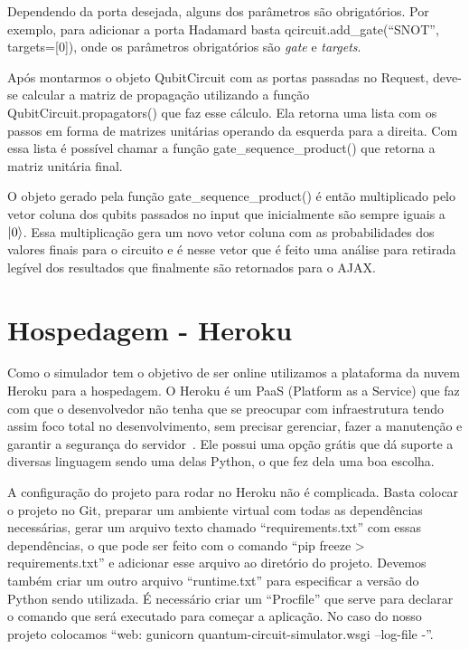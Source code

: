 \documentclass[a4paper, 12pt, oneside]{book}
\begin{document}
Dependendo da porta desejada, alguns dos parâmetros são obrigatórios. Por exemplo, para adicionar a porta Hadamard basta qcircuit.add\_gate(``SNOT'', targets=[0]), onde os parâmetros obrigatórios são \textit{gate} e \textit{targets}.

Após montarmos o objeto QubitCircuit com as portas passadas no Request, deve-se calcular a matriz de propagação utilizando a função QubitCircuit.propagators() que faz esse cálculo. Ela retorna uma lista com os passos em forma de matrizes unitárias operando da esquerda para a direita. Com essa lista é possível chamar a função gate\_sequence\_product() que retorna a matriz unitária final.

O objeto gerado pela função gate\_sequence\_product() é então multiplicado pelo vetor coluna dos qubits passados no input que inicialmente são sempre iguais a $\ket{0}$. Essa multiplicação gera um novo vetor coluna com as probabilidades dos valores finais para o circuito e é nesse vetor que é feito uma análise para retirada legível dos resultados que finalmente são retornados para o AJAX.

\section{Hospedagem - Heroku}

Como o simulador tem o objetivo de ser online utilizamos a plataforma da nuvem Heroku para a hospedagem. O Heroku é um PaaS (Platform as a Service) que faz com que o desenvolvedor não tenha que se preocupar com infraestrutura tendo assim foco total no desenvolvimento, sem precisar gerenciar, fazer a manutenção e garantir a segurança do servidor~\cite{heroku}. Ele possui uma opção grátis que dá suporte a diversas linguagem sendo uma delas Python, o que fez dela uma boa escolha.

A configuração do projeto para rodar no Heroku não é complicada. Basta colocar o projeto no Git, preparar um ambiente virtual com todas as dependências necessárias, gerar um arquivo texto chamado ``requirements.txt'' com essas dependências, o que pode ser feito com o comando ``pip freeze > requirements.txt'' e adicionar esse arquivo ao diretório do projeto. Devemos também criar um outro arquivo ``runtime.txt'' para especificar a versão do Python sendo utilizada. É necessário criar um ``Procfile'' que serve para declarar o comando que será executado para começar a aplicação. No caso do nosso projeto colocamos ``web: gunicorn quantum-circuit-simulator.wsgi --log-file -''.
\end{document}

